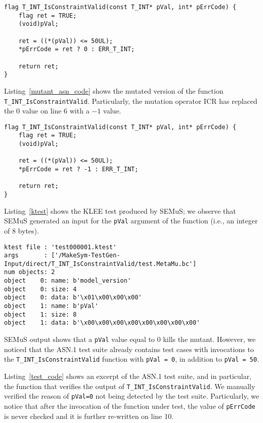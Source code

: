\begin{lstlisting}[style=CStyle, float=t, caption=Original code., label=original_asn_code]
flag T_INT_IsConstraintValid(const T_INT* pVal, int* pErrCode) {
    flag ret = TRUE;
    (void)pVal;

    ret = ((*(pVal)) <= 50UL);
    *pErrCode = ret ? 0 : ERR_T_INT; 

    return ret;
}
\end{lstlisting}

Listing~\ref{mutant_asn_code} shows the mutated version of the function \texttt{T\_INT\_IsConstraintValid}. Particularly, the mutation operator ICR has replaced the $0$ value on line 6 with a $-1$ value.

\begin{lstlisting}[style=CStyle, float=t, caption=Mutant code., label=mutant_asn_code]
flag T_INT_IsConstraintValid(const T_INT* pVal, int* pErrCode) {
    flag ret = TRUE;
    (void)pVal;

    ret = ((*(pVal)) <= 50UL);
    *pErrCode = ret ? -1 : ERR_T_INT;

    return ret;
}
\end{lstlisting}


Listing~\ref{ktest} shows the KLEE test produced by SEMuS; we observe that SEMuS generated an input for the \texttt{pVal} argument of the function (i.e., an integer of 8 bytes).

\begin{lstlisting}[language={}, float=t, caption=Klee-test output, label=ktest]
ktest file : 'test000001.ktest'
args       : ['/MakeSym-TestGen-Input/direct/T_INT_IsConstraintValid/test.MetaMu.bc']
num objects: 2
object    0: name: b'model_version'
object    0: size: 4
object    0: data: b'\x01\x00\x00\x00'
object    1: name: b'pVal'
object    1: size: 8
object    1: data: b'\x00\x00\x00\x00\x00\x00\x00\x00'
\end{lstlisting}

SEMuS output shows that a \texttt{pVal} value equal to 0 kills the mutant. 
However, we noticed that the ASN.1 test suite already contains test cases with invocations to the \texttt{T\_INT\_IsConstraintValid} function with \texttt{pVal = 0}, in addition to \texttt{pVal = 50}.

Listing~\ref{test_code} shows an excerpt of the ASN.1 test suite, and in particular, the function that verifies the output of \texttt{T\_INT\_IsConstraintValid}. 
We manually verified the reason of \texttt{pVal=0} not being detected by the test suite. Particularly, we notice that after the invocation of the function under test, the value of \texttt{pErrCode} is never checked and it is further re-written on line 10. 


